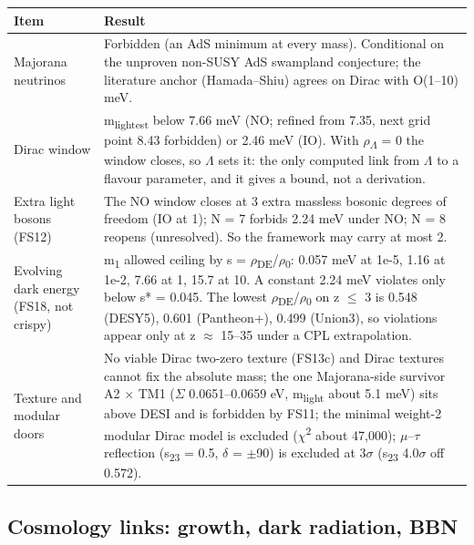 \documentclass[10pt]{article}
\begin{document}
{\footnotesize\begin{longtable}{>{\raggedright\arraybackslash}p{\dimexpr(\linewidth-4\tabcolsep)/2\relax}>{\raggedright\arraybackslash}p{\dimexpr(\linewidth-4\tabcolsep)/2\relax}}
\toprule
\textbf{Item} & \textbf{Result} \\
\midrule
\endhead
Majorana neutrinos & Forbidden (an AdS minimum at every mass). Conditional on the unproven non-SUSY AdS swampland conjecture; the literature anchor (Hamada--Shiu) agrees on Dirac with O(1--10) meV. \\
Dirac window & m\textsubscript{lightest} below 7.66 meV (NO; refined from 7.35, next grid point 8.43 forbidden) or 2.46 meV (IO). With \ensuremath{\rho}\textsubscript{\ensuremath{\Lambda}} = 0 the window closes, so \ensuremath{\Lambda} sets it: the only computed link from \ensuremath{\Lambda} to a flavour parameter, and it gives a bound, not a derivation. \\
Extra light bosons (FS12) & The NO window closes at 3 extra massless bosonic degrees of freedom (IO at 1); N = 7 forbids 2.24 meV under NO; N = 8 reopens (unresolved). So the framework may carry at most 2. \\
Evolving dark energy (FS18, not crispy) & m\textsubscript{1} allowed ceiling by s = \ensuremath{\rho}\textsubscript{DE}/\ensuremath{\rho}\textsubscript{0}: 0.057 meV at 1e-5, 1.16 at 1e-2, 7.66 at 1, 15.7 at 10. A constant 2.24 meV violates only below s* = 0.045. The lowest \ensuremath{\rho}\textsubscript{DE}/\ensuremath{\rho}\textsubscript{0} on z \ensuremath{\leq} 3 is 0.548 (DESY5), 0.601 (Pantheon+), 0.499 (Union3), so violations appear only at z \ensuremath{\approx} 15--35 under a CPL extrapolation. \\
Texture and modular doors & No viable Dirac two-zero texture (FS13c) and Dirac textures cannot fix the absolute mass; the one Majorana-side survivor A2 \ensuremath{\times} TM1 (\ensuremath{\Sigma} 0.0651--0.0659 eV, m\textsubscript{light} about 5.1 meV) sits above DESI and is forbidden by FS11; the minimal weight-2 modular Dirac model is excluded (\ensuremath{\chi}\textsuperscript{2} about 47,000); \ensuremath{\mu}--\ensuremath{\tau} reflection (s\textsubscript{2}\textsubscript{3} = 0.5, \ensuremath{\delta} = \ensuremath{\pm}90\textdegree{}) is excluded at 3\ensuremath{\sigma} (s\textsubscript{2}\textsubscript{3} 4.0\ensuremath{\sigma} off 0.572). \\
\bottomrule
\end{longtable}}

\subsection*{Cosmology links: growth, dark radiation, BBN}
\end{document}
